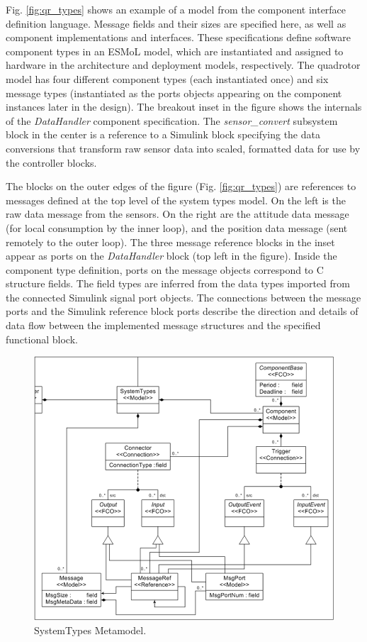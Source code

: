 Fig. \ref{fig:qr_types} shows an example of a model from the 
component interface definition language.  Message fields 
and their sizes are specified here, as well as component 
implementations and interfaces.  These specifications define 
software component types in an ESMoL model, which are instantiated 
and assigned to hardware in the architecture and deployment models,
respectively.  The quadrotor 
model has four different component types (each instantiated once) 
and six message types (instantiated as the ports objects appearing 
on the component instances later in the design).  The breakout inset in 
the figure shows the internals of the \emph{DataHandler} component 
specification.  The \emph{sensor\_convert} subsystem block 
in the center is a reference to a Simulink block specifying the data
conversions that transform raw sensor data into scaled, formatted
data for use by the controller blocks.

The blocks on the outer edges of the figure (Fig. \ref{fig:qr_types}) 
are references to messages 
defined at the top level of the system types model. 
On the left is the raw data message from the sensors.  On the right are
the attitude data message (for local consumption by the inner loop), and 
the position data message (sent remotely to the outer loop). 
The three message reference blocks in the inset appear as ports on the 
\emph{DataHandler} block (top left in the figure).  Inside the 
component type definition, ports on the message objects 
correspond to C structure fields. The field types are
inferred from the data types imported from the connected Simulink
signal port objects. The 
connections between the message ports and the Simulink 
reference block ports describe the direction and details 
of data flow between the implemented message structures 
and the specified functional block.

\begin{figure}
	\centering
	\includegraphics[width=0.85\columnwidth]{figures/arch_lang.png}
	\caption{SystemTypes Metamodel.} 
	\label{fig:arch}
\end{figure}

